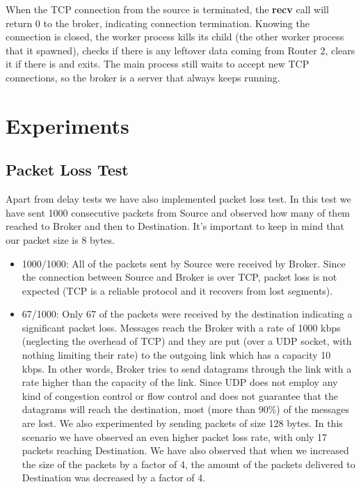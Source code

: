 \documentclass[conference]{IEEEtran}
\begin{document}
When the TCP connection from the source is terminated, the \textbf{recv} call will return 0
to the broker, indicating connection termination. Knowing the connection is closed,
the worker process kills its child (the other worker process that it spawned),
checks if there is any leftover data coming from Router 2, clears it if there is
and exits. The main process still waits to accept new TCP connections, so the broker
is a server that always keeps running.

\section{Experiments}

\subsection{Packet Loss Test}\label{AA}

Apart from delay tests we have also implemented packet loss test. In this test we have sent 1000 consecutive packets from Source and observed how many of them reached to Broker and then to Destination. It's important to keep in mind that our packet size is 8 bytes. 
\begin{itemize}
    \item 1000/1000: All of the packets sent by Source were received by Broker. Since the connection between Source and Broker is over TCP, packet loss is not expected (TCP is a reliable protocol and it recovers from lost segments).
    \item 67/1000: Only 67 of the packets were received by the destination indicating a significant packet loss. Messages reach the Broker with a rate of 1000 kbps (neglecting the overhead of TCP) and they are put (over a UDP socket, with nothing limiting their rate) to the outgoing link which has a capacity 10 kbps. In other words, Broker tries to send datagrams through the link with a rate higher than the capacity of the link. Since UDP does not employ any kind of congestion control or flow control and does not guarantee that the datagrams will reach the destination, most (more than 90\%) of the messages are lost. We also experimented by sending packets of size 128 bytes. In this scenario we have observed an even higher packet loss rate, with only 17 packets reaching Destination. We have also observed that when we increased the size of the packets by a factor of 4, the amount of the packets delivered to Destination was decreased by a factor of 4. \\ \\ \\
\end{itemize}
\end{document}
